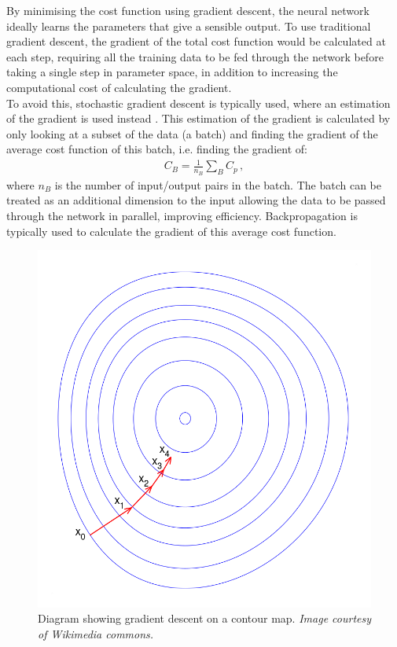 \documentclass[11pt,a4paper,onecolumn]{report}
\begin{document}
By minimising the cost function using gradient descent, the neural network
ideally learns the parameters that give a sensible output. To use traditional
gradient descent, the gradient of the total cost function would be calculated at
each step, requiring all the training data to be fed through the network before
taking a single step in parameter space, in addition to increasing the
computational cost of calculating the gradient.\\

To avoid this, stochastic gradient descent is typically used, where an
estimation of the gradient is used instead \citep{Bottou2010}. This estimation of
the gradient is calculated by only looking at a subset of the data (a batch) and
finding the gradient of the average cost function of this batch, i.e. finding
the gradient of:
\begin{align}
  C_B = \frac{1}{n_B} \sum\limits_{B} C_p \label{eqn:average cost}\,,
\end{align}
where \(n_B\) is the number of input/output pairs in the batch. The batch can be
treated as an additional dimension to the input allowing the data to be passed
through the network in parallel, improving efficiency. Backpropagation
\citep{rumelhart_learning_1986} is typically used to calculate the gradient of
this average cost function.

\begin{figure}[t]
  \centering
  \includegraphics[width = 0.4\linewidth]{gradient_descent.png}
  \caption{Diagram showing gradient descent on a contour map. \textit{Image
  courtesy of Wikimedia commons.}}
  \label{fig:gradient_descent}
\end{figure}
\end{document}
